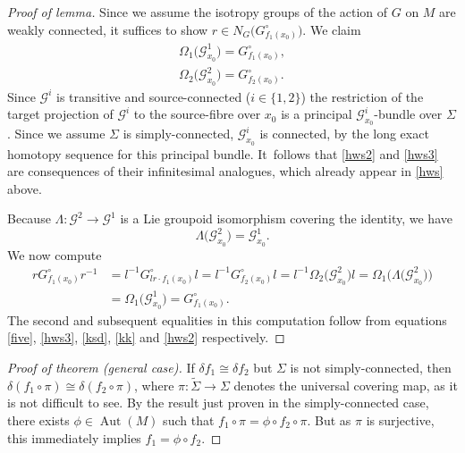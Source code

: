 \documentclass[11pt]{article}
\numberwithin{equation}{section}
\numberwithin{equation}{section}
\DeclareMathOperator{\automorphism}{Aut}
\begin{document}
\begin{proof}[Proof of lemma] Since we assume the isotropy groups of
the action of $G$ on $M$ are weakly connected, it suffices to show $r
\in N_G\big(G_{f_1(x_0)}^\circ\big)$. We claim
 \begin{gather}
 \Omega_1\big({\mathcal G}^1_{x_0}\big)=G_{f_1(x_0)}^\circ ,\label{hws2}
 \\
\Omega_2\big({\mathcal G}^2_{x_0}\big)=G_{f_2(x_0)}^\circ.\label{hws3}
 \end{gather}
 Since ${\mathcal G}^i$ is transitive and
source-connected ($i \in \{1,2\}$) the restriction of the target
projection of ${\mathcal G}^i$ to the source-fibre over $x_0$ is a
principal ${\mathcal G}^i_{x_0}$-bundle over $\Sigma $. Since we
assume $\Sigma $ is simply-connected, ${\mathcal G}^i_{x_0}$ is
connected, by the long exact homotopy sequence for this principal
bundle. It~follows that \eqref{hws2} and \eqref{hws3} are consequences
of their infinitesimal analogues, which already appear in \eqref{hws}
above.

 Because $\Lambda \colon {\mathcal G}^2 \rightarrow {\mathcal G}^1$
is a Lie groupoid isomorphism covering the identity, we have
 \begin{equation}
 \Lambda \big({\mathcal G}^2_{x_0}\big) ={\mathcal G}^1_{x_0}.\label{kk}
 \end{equation}
 We now compute
 \begin{align*}
 r G_{f_1(x_0)}^\circ r^{-1} &= l^{-1}G_{lr \cdot
f_1(x_0)}^\circ l = l^{-1}G_{f_2(x_0)}^\circ l=l^{-1} \Omega_2
\big({\mathcal G}^2_{x_0}\big)l = \Omega_1
\big(\Lambda\big({\mathcal G}^2_{x_0}\big)\big)
\\
&=\Omega_1 \big({\mathcal
G}^1_{x_0}\big)=G_{f_1(x_0)}^\circ.
 \end{align*}
 The second and subsequent equalities in this
computation follow from equations \eqref{five}, \eqref{hws3},
\eqref{ksd}, \eqref{kk} and \eqref{hws2} respectively.
\end{proof}

\begin{proof}[Proof of theorem {\normalfont(general case)}]\sloppy If $\delta f_1 \cong
\delta f_2$ but $\Sigma $ is not simply-connected, then \mbox{$\delta(f_1
\circ \pi)\cong \delta(f_2 \circ \pi)$}, where $\pi \colon \tilde
\Sigma \rightarrow \Sigma $ denotes the universal covering map, as it
is not difficult to see. By the result just proven in the
simply-connected case, there exists $\phi \in \automorphism(M)$ such
that $f_1 \circ \pi = \phi \circ f_2 \circ \pi $. But as $\pi $ is
surjective, this immediately implies $f_1 = \phi \circ f_2 $.
\end{proof}
\end{document}

